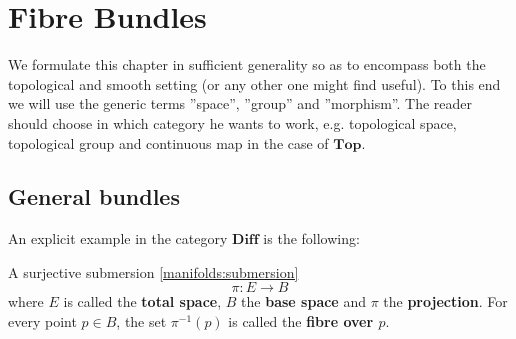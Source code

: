 \chapter{Fibre Bundles}\label{chapter:bundles}

    We formulate this chapter in sufficient generality so as to encompass both the topological and smooth setting (or any other one might find useful). To this end we will use the generic terms ''space'', ''group'' and ''morphism''. The reader should choose in which category he wants to work, e.g. topological space, topological group and continuous map in the case of $\mathbf{Top}$.

\section{General bundles}


    An explicit example in the category $\mathbf{Diff}$ is the following:
    \begin{example}
        A surjective submersion \ref{manifolds:submersion} \[\pi:E\rightarrow B\] where $E$ is called the \textbf{total space}, $B$ the \textbf{base space} and $\pi$ the \textbf{projection}. For every point $p\in B$, the set $\pi^{-1}(p)$ is called the \textbf{fibre over $p$}.
    \end{example}

